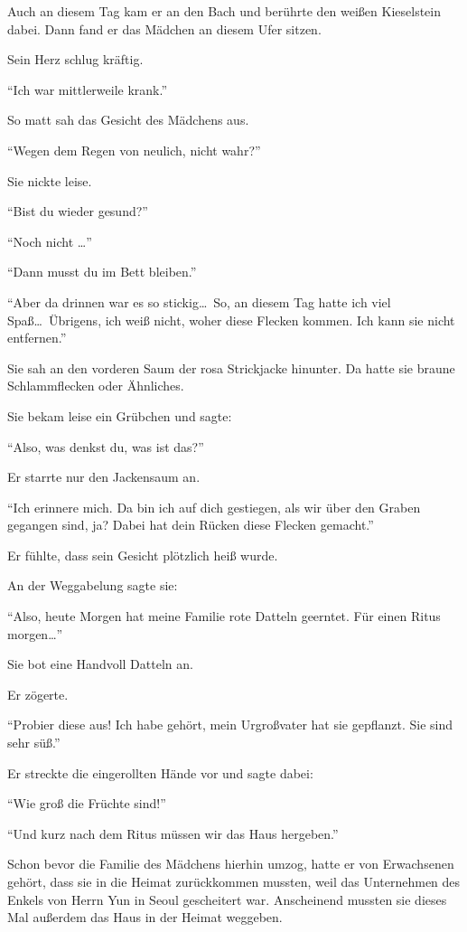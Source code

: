 \documentclass[prd,12pt,tightenlines,notitlepage,nofootinbib]{revtex4-1}
\begin{document}
Auch an diesem Tag kam er an den Bach und berührte
den weißen Kieselstein dabei.
Dann fand er das Mädchen an diesem Ufer sitzen.

Sein Herz schlug kräftig.

"`Ich war mittlerweile krank."'

So matt sah das Gesicht des Mädchens aus.

"`Wegen dem Regen von neulich, nicht wahr?"'

Sie nickte leise.

"`Bist du wieder gesund?"'

"`Noch nicht \ldots"'

"`Dann musst du im Bett bleiben."'

"`Aber da drinnen war es so stickig\ldots\
So, an diesem Tag hatte ich viel Spaß\ldots\
Übrigens, ich weiß nicht, woher diese Flecken kommen.
Ich kann sie nicht entfernen."'

Sie sah an den vorderen Saum der rosa Strickjacke hinunter.
Da hatte sie braune Schlammflecken oder Ähnliches.

Sie bekam leise ein Grübchen und sagte:

"`Also, was denkst du, was ist das?"'

Er starrte nur den Jackensaum an.

"`Ich erinnere mich.
Da bin ich auf dich gestiegen,
als wir über den Graben gegangen sind, ja?
Dabei hat dein Rücken diese Flecken gemacht."'

Er fühlte, dass sein Gesicht plötzlich heiß wurde.

An der Weggabelung sagte sie:

"`Also, heute Morgen hat meine Familie rote Datteln geerntet.
Für einen Ritus morgen\ldots"'

Sie bot eine Handvoll Datteln an.

Er zögerte.

"`Probier diese aus!
Ich habe gehört, mein Urgroßvater hat sie gepflanzt.
Sie sind sehr süß."'

Er streckte die eingerollten Hände vor und sagte dabei:

"`Wie groß die Früchte sind!"'

"`Und kurz nach dem Ritus müssen wir das Haus hergeben."'

Schon bevor die Familie des Mädchens hierhin umzog,
hatte er von Erwachsenen gehört,
dass sie in die Heimat zurückkommen mussten,
weil das Unternehmen des Enkels von Herrn Yun in Seoul gescheitert war.
Anscheinend mussten sie dieses Mal außerdem das Haus in der Heimat weggeben.
\end{document}
